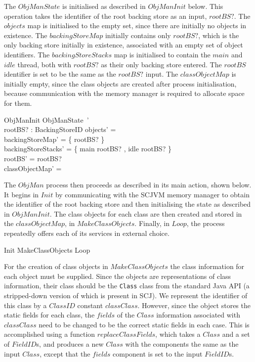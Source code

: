The $ObjManState$ is initialised as described in $ObjManInit$ below.
This operation takes the identifier of the root backing store as an
input, $rootBS?$.
The $objects$ map is initialised to the empty set, since there are
initially no objects in existence.
The $backingStoreMap$ initially contains only $rootBS?$, which is the
only backing store initially in existence, associated with an empty
set of object identifiers.
The $backingStoreStacks$ map is initialised to contain the $main$ and
$idle$ thread, both with $rootBS?$ as their only backing store
entered.
The $rootBS$ identifier is set to be the same as the $rootBS?$ input.
The $classObjectMap$ is initially empty, since the class objects are
created after process initialisation, because communication with the
memory manager is required to allocate space for them.
\begin{schema}{ObjManInit}
  ObjManState~' \\
  rootBS? : BackingStoreID
\where
  objects' = \emptyset \\
  backingStoreMap' = \{ rootBS? \mapsto \emptyset \} \\
  backingStoreStacks' = \{ main \mapsto \langle rootBS? \rangle, idle \mapsto \langle rootBS? \rangle \} \\
  rootBS' = rootBS? \\
  classObjectMap' = \emptyset
\end{schema}

The $ObjMan$ process then proceeds as described in its main action,
shown below.
It begins in $Init$ by communicating with the SCJVM memory manager to
obtain the identifier of the root backing store and then initialising
the state as described in $ObjManInit$.
The class objects for each class are then created and stored in the
$classObjectMap$, in $MakeClassObjects$.
Finally, in $Loop$, the process repeatedly offers each of its services
in external choice.
\begin{circusaction}
  \circspot Init \circseq MakeClassObjects \circseq Loop
\end{circusaction}

For the creation of class objects in $MakeClassObjects$ the class
information for each object must be supplied.
Since the objects are representations of class information, their
class should be the \texttt{Class} class from the standard Java API (a
stripped-down version of which is present in SCJ).
We represent the identifier of this class by a $ClassID$ constant
$classClass$.
However, since the object stores the static fields for each class, the
$fields$ of the $Class$ information associated with $classClass$ need
to be changed to be the correct static fields in each case.
This is accomplished using a function $replaceClassFields$, which
takes a $Class$ and a set of $FieldID$s, and produces a new $Class$
with the components the same as the input $Class$, except that the
$fields$ component is set to the input $FieldID$s.

